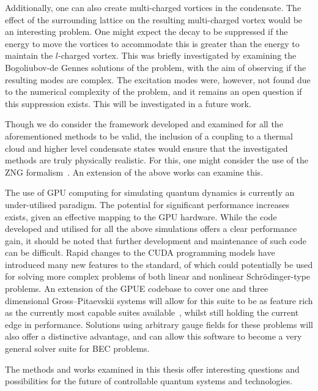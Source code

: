 Additionally, one can also create multi-charged vortices in the condensate. The effect of the surrounding lattice on the resulting multi-charged vortex would be an interesting problem. One might expect the decay to be suppressed if the energy to move the vortices to accommodate this is greater than the energy to maintain the $l$-charged vortex. This was briefly investigated by examining the Bogoliubov-de Gennes solutions of the problem, with the aim of observing if the resulting modes are complex. The excitation modes were, however, not found due to the numerical complexity of the problem, and it remains an open question if this suppression exists. This will be investigated in a future work.

Though we do consider the framework developed and examined for all the aforementioned methods to be valid, the inclusion of a coupling to a thermal cloud and higher level condensate states would ensure that the investigated methods are truly physically realistic. For this, one might consider the use of the ZNG formalism~\cite{BK:Proukakis_finitetemp_2013}. An extension of the above works can examine this.

The use of GPU computing for simulating quantum dynamics is currently an under-utilised paradigm. The potential for significant performance increases exists, given an effective mapping to the GPU hardware. While the code developed and utilised for all the above simulations offers a clear performance gain, it should be noted that further development and maintenance of such code can be difficult. Rapid changes to the CUDA programming models have introduced many new features to the standard, of which could potentially be used for solving more complex problems of both linear and nonlinear Schr\"odinger-type problems. An extension of the GPUE codebase to cover one and three dimensional Gross--Pitaevskii systems will allow for this suite to be as feature rich as the currently most capable suites available~\cite{NUM:Wittek_cpc_2013,NUM:GPElab_1}, whilst still holding the current edge in performance. Solutions using arbitrary gauge fields for these problems will also offer a distinctive advantage, and can allow this software to become a very general solver suite for BEC problems.

The methods and works examined in this thesis offer interesting questions and possibilities for the future of controllable quantum systems and technologies.
